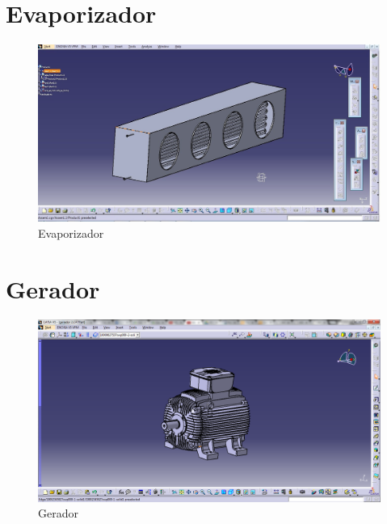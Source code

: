 \section{Evaporizador}
\begin{figure}[!htbp]
	  \centering
	  \includegraphics[scale=0.45]{editaveis/figuras/C_evaporizador}
	  \caption[Evaporizador]{Evaporizador}
	  \label{Evaporizador}
	\end{figure}
	\FloatBarrier		
	
\section{Gerador}
	\begin{figure}[!htbp]
	  \centering
	  \includegraphics[scale=0.45]{editaveis/figuras/C_Gerador}
	  \caption[Gerador]{Gerador}
	  \label{Gerador}
	\end{figure}
	\FloatBarrier

